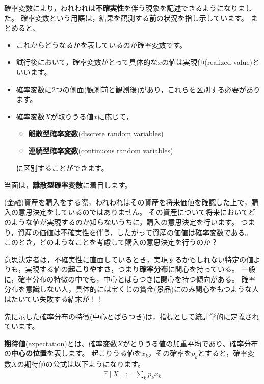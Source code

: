 \documentclass[
  letterpaper,
  pandoc,
  ja=standard,
  jafont = hiragino-pron]{ltjsbook}
\providecommand{\tightlist}{%
  \setlength{\itemsep}{0pt}\setlength{\parskip}{0pt}}\usepackage{longtable,booktabs,array}
\begin{document}
確率変数により，われわれは\textbf{不確実性}を伴う現象を記述できるようになりました。
確率変数という用語は，結果を観測する\textbf{前}の状況を指し示しています。
まとめると、

\begin{itemize}
\tightlist
\item
  これからどうなるかを表しているのが確率変数です。
\item
  試行後において，確率変数がとって具体的な\(x\)の値は実現値(realized
  value)といいます。
\item
  確率変数に2つの側面(観測前と観測後)があり，これらを区別する必要があります。
\item
  確率変数\(X\)が取りうる値\(x\)に応じて，

  \begin{itemize}
  \tightlist
  \item
    \textbf{離散型確率変数}(discrete random variables)
  \item
    \textbf{連続型確率変数}(continuous random variables)
  \end{itemize}

  に区別することができます。
\end{itemize}

当面は，\textbf{離散型確率変数}に着目します。

(金融)資産を購入をする際，われわれはその資産を将来価値を確認した上で，購入の意思決定をしているのではありません。
その資産について将来においてどのような値が実現するのか知らないうちに，購入の意思決定を行います。
つまり，資産の価値は不確実性を伴う，したがって資産の価値は確率変数である。
このとき，どのようなことを考慮して購入の意思決定を行うのか？

意思決定者は，不確実性に直面しているとき，実現するかもしれない特定の値よりも，実現する値の\textbf{起こりやすさ}，つまり\textbf{確率分布}に関心を持っている。
一般に，確率分布の特徴の中でも，中心とばらつきに関心を持つ傾向がある。
確率分布を意識しない人，具体的には宝くじの賞金(景品)にのみ関心をもつような人はたいてい失敗する結末が！！

先に示した確率分布の特徴(中心とばらつき)は，指標として統計学的に定義されています。

\begin{tcolorbox}[enhanced jigsaw, colframe=quarto-callout-important-color-frame, breakable, rightrule=.15mm, coltitle=black, title=\textcolor{quarto-callout-important-color}{\faExclamation}\hspace{0.5em}{期待値}, colbacktitle=quarto-callout-important-color!10!white, leftrule=.75mm, colback=white, left=2mm, arc=.35mm, opacityback=0, titlerule=0mm, toptitle=1mm, bottomtitle=1mm, bottomrule=.15mm, toprule=.15mm, opacitybacktitle=0.6]

\textbf{期待値}(expectation)とは、確率変数\(X\)がとりうる値の加重平均であり、確率分布の\textbf{中心の位置}を表します。
起こりうる値を\(x_k\)，その確率を\(p_k\)とすると，確率変数\(X\)の期待値の公式は以下ようになります。
\[
\begin{aligned}
\mathbb{E} [X] := \sum _{k} p_k x_k
\end{aligned}
\]

\end{tcolorbox}
\end{document}
